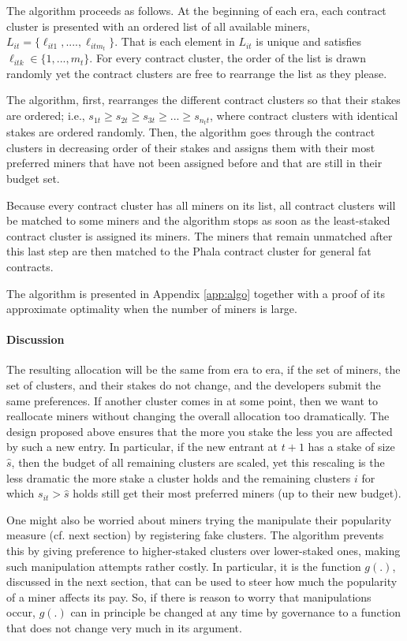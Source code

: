 \documentclass[11pt, a4paper, twocolumn]{article}
\begin{document}
The algorithm proceeds as follows. At the beginning of each era, each contract cluster is presented with an ordered list of all available miners, $L_{it} = \{ \ell_{it1}, ...., \ell_{i t m_t} \}$. That is each element in $L_{it}$ is unique and satisfies $\ell_{itk} \in \{1,...,m_t\}$. For every contract cluster, the order of the list is drawn randomly yet the contract clusters are free to rearrange the list as they please. 

The algorithm, first, rearranges the different contract clusters so that their stakes are ordered; i.e., $s_{1t} \geq s_{2t} \geq s_{3t} \geq ... \geq s_{n_tt}$, where contract clusters with identical stakes are ordered randomly. Then, the algorithm goes through the contract clusters in decreasing order of their stakes and assigns them with their most preferred miners that have not been assigned before and that are still in their budget set. 

Because every contract cluster has all miners on its list, all contract clusters will be matched to some miners and the algorithm stops as soon as the least-staked contract cluster is assigned its miners. The miners that remain unmatched after this last step are then matched to the Phala contract cluster for general fat contracts.

The algorithm is presented in Appendix \ref{app:algo} together with a proof of its approximate optimality when the number of miners is large.

\paragraph{Discussion} The resulting allocation will be the same from era to era, if the set of miners, the set of clusters, and their stakes do not change, and the developers submit the same preferences. If another cluster comes in at some point, then we want to reallocate miners without changing the overall allocation too dramatically. The design proposed above ensures that the more you stake the less you are affected by such a new entry. In particular, if the new entrant at $t+1$ has a stake of size $\hat s$, then the budget of all remaining clusters are scaled, yet this rescaling is the less dramatic the more stake a cluster holds and the remaining clusters $i$ for which $s_{it} > \hat s$ holds still get their most preferred miners (up to their new budget).

One might also be worried about miners trying the manipulate their popularity measure (cf. next section) by registering fake clusters. The algorithm prevents this by giving preference to higher-staked clusters over lower-staked ones, making such manipulation attempts rather costly. In particular, it is the function $g(.)$, discussed in the next section, that can be used to steer how much the popularity of a miner affects its pay. So, if there is reason to worry that manipulations occur, $g(.)$ can in principle be changed at any time by governance to a function that does not change very much in its argument.
\end{document}
